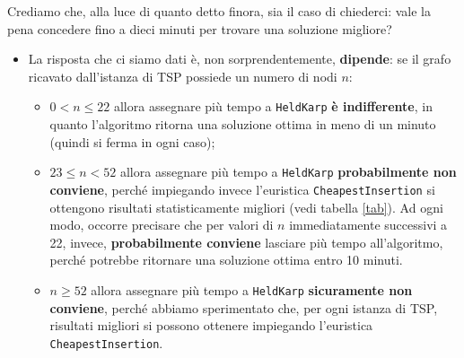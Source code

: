Crediamo che, alla luce di quanto detto finora, sia il caso di chiederci: vale la pena concedere fino a dieci minuti per trovare una soluzione migliore?
\begin{itemize}
	\item La risposta che ci siamo dati è, non sorprendentemente, \textbf{dipende}: se il grafo ricavato dall'istanza di TSP possiede un numero di nodi $n$:
	\begin{itemize}
		\item $0< n \leq 22 $ allora assegnare più tempo a \texttt{HeldKarp} \textbf{è indifferente}, in quanto l'algoritmo ritorna una soluzione ottima in meno di un minuto (quindi si ferma in ogni caso);\newpage
		\item $23 \leq n < 52$ allora assegnare più tempo a \texttt{HeldKarp}\textbf{ probabilmente non conviene}, perché impiegando invece l'euristica \texttt{CheapestInsertion} si ottengono risultati statisticamente migliori (vedi tabella \ref{tab}). Ad ogni modo, occorre precisare che per valori di $n$ immediatamente successivi a 22, invece, \textbf{probabilmente conviene} lasciare più tempo all'algoritmo, perché potrebbe ritornare una soluzione ottima entro 10 minuti.
		\item $ n\geq 52$ allora assegnare più tempo a \texttt{HeldKarp} \textbf{sicuramente non conviene}, perché abbiamo sperimentato che, per ogni istanza di TSP, risultati migliori si possono ottenere impiegando l'euristica \texttt{CheapestInsertion}.
	\end{itemize}
\end{itemize}